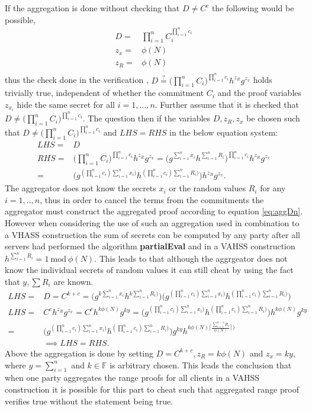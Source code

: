 If  the aggregation is done without checking that $D \neq C^c$ the following would be possible,
\begin{align*}
D =& \prod_{i=1}^n C_i ^{\prod_{i=1}^n c_i}	\\
z_x =& \phi(N)	\\
z_R =& \phi(N)	\\
\end{align*}
thus the check done in the verification , $D\overset{?}{=} \big(\prod_{i=1}^nC_i\big)^{\prod_{i=1}^n c_i} h^{z_R}g^{z_x}$ holds trivially true, independent of whether the commitment $C_i$ and the proof variables  $z_{x_i}$ hide the same secret for all $i=1,...,n$. Further assume that it is checked that $D \neq \big(\prod_{i=1}^nC_i\big)^{\prod_{i=1}^n c_i}$. The question then if the variables $D,z_R,z_x$ be chosen such that $D \neq \big(\prod_{i=1}^nC_i\big)^{\prod_{i=1}^n c_i}$ and $LHS=RHS$ in the below equation system:
\begin{align*}
LHS =& D\\
RHS  =& \big(\prod_{i=1}^nC_i\big)^{\prod_{i=1}^n c_i} h^{z_R}g^{z_x} =
\big( g^{\sum_{i=1}^n x_i } h^{\sum_{i=1}^n R_i} \big) ^{\prod_{i=1}^n c_i}h^{z_R} g^{z_x} \\
=& \big( g^{ (  \prod_{i=1}^n c_i ) \sum_{i=1}^n x_i ) } h^{ ( \prod_{i=1}^n c_i ) \sum_{i=1}^n R_i ) } \big)h^{z_R} g^{z_x}.
\end{align*}
The aggregator does not know the secrets $x_i$ or the random values $R_i$ for any $i=1,..,n$, thus in order to cancel the terms from the commitments the aggregator must construct the aggregated proof according to equation \eqref{eq:aggDn}.  However when considering the use of such an aggregation used in combination to a VHASS construction the sum of secrets can be computed by any party after all servers had performed the algorithm \textbf{partialEval} and in a VAHSS construction $h^{\sum_{i=1}^n R_i } =1 \: \text{mod}\:  \phi(N)$. This leads to that although the aggrgeator does not know the individual secrets of random values it can still cheat by using the fact that $y, \sum{R_i}$ are known. 
\begin{align*}
LHS =& D = C^{k+c}= \big( g^ { k \sum_{i=1}^n x_i } h^{ k  \sum_{i=1}^n R_i ) } \big)   \big( g^{ (  \prod_{i=1}^n c_i ) \sum_{i=1}^n x_i ) } h^{ ( \prod_{i=1}^n c_i ) \sum_{i=1}^n R_i ) } \big)   \\
LHS =& C^c h^{z_R}g^{z_x} = C^c h^{k \phi (N) } g^{k y} =  \big( g^{ (  \prod_{i=1}^n c_i ) \sum_{i=1}^n x_i ) } h^{ ( \prod_{i=1}^n c_i ) \sum_{i=1}^n R_i ) } \big) h^{k\phi (N)} g^{ky}\\
= &  \big( g^{ (  \prod_{i=1}^n c_i ) \sum_{i=1}^n x_i ) } h^{ ( \prod_{i=1}^n c_i ) \sum_{i=1}^n R_i ) } \big)g^ { k y} h^{ k  \phi(N)\lceil \frac{\sum_{i=1}^{n-1}R_i}{\phi(N)}\rceil ) }\\
& \implies LHS= RHS.
\end{align*}
Above the aggregation is done by setting $D=C^{k+c}, z_R = k\phi (N)$ and $z_x = k y$, where $y= \sum_{i=1}^n$ and $k\in \mathds{F}$ is arbitrary chosen.  This leads the conclusion that when one party aggregates the range proofs for all clients in a VAHSS construction it is possible for this part to cheat such that aggregated range proof verifies true without the statement being true.

